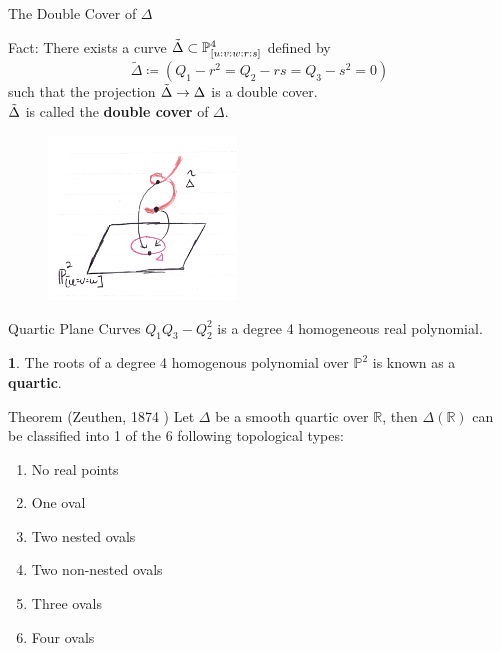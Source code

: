 \documentclass[hyperref, notheorems]{beamer}
\newcommand{\Rbb}{\mathbb{R}}
\newcommand{\Pbb}{\mathbb{P}}
\theoremstyle{definition}
\newtheorem{definition}{\translate{Definition}}
\begin{document}
\begin{frame}{The Double Cover of $\Delta$}
    \begin{block}{Fact:}
        There exists a curve $\Tilde{\Delta} \subset \Pbb^4_{[u:v:w:r:s]}$ defined by
        \[\tilde{\Delta} \coloneqq (Q_1 - r^2 = Q_2 - rs = Q_3 - s^2 = 0)\]
        such that the projection $\Tilde{\Delta} \to \Delta$ is a double cover.\\ $\Tilde{\Delta}$ is called the \textbf{double cover} of $\Delta$. 
    \end{block}
    \begin{figure}[h]
    \includegraphics[width=5cm]{graphics/double_cover.png}
\end{figure}
\end{frame}

\begin{frame}{Quartic Plane Curves}
$Q_1Q_3 - Q_2^2$ is a degree 4 homogeneous real polynomial.
\begin{definition}
The roots of a degree 4 homogenous polynomial over $\Pbb^2$ is known as a \textbf{quartic}.
\end{definition}
        \begin{block}{Theorem (Zeuthen, 1874 \cite{Zeuthen1874})}
       Let $\Delta$ be a smooth quartic over $\Rbb$, then $\Delta(\Rbb)$ can be classified into 1 of the 6 following topological types:
       \begin{enumerate}
           \item No real points
           \item One oval
           \item Two nested ovals
           \item Two non-nested ovals
           \item Three ovals
           \item Four ovals
       \end{enumerate}
        \end{block}
\end{frame}
\end{document}

